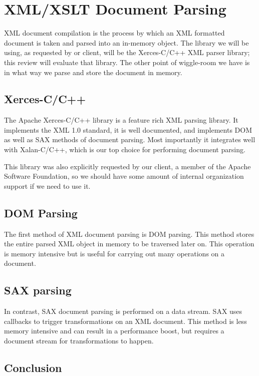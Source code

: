 \section{XML/XSLT Document Parsing}

XML document compilation is the process by which an XML formatted document is taken and parsed into an in-memory object.
The library we will be using, as requested by or client, will be the Xerces-C/C++ XML parser library; this review will evaluate that library.
The other point of wiggle-room we have is in what way we parse and store the document in memory.

\subsection{Xerces-C/C++}

The Apache Xerces-C/C++ library is a feature rich XML parsing library.
It implements the XML 1.0 standard, it is well documented, and implements DOM as well as SAX methods of document parsing.
Most importantly it integrates well with Xalan-C/C++, which is our top choice for performing document parsing.

This library was also explicitly requested by our client, a member of the Apache Software Foundation, so we should have some amount of internal organization support if we need to use it.

\subsection{DOM Parsing}

The first method of XML document parsing is DOM parsing.
This method stores the entire parsed XML object in memory to be traversed later on.
This operation is memory intensive but is useful for carrying out many operations on a document.
\cite{dom-vs-sax}

\subsection{SAX parsing}

In contrast, SAX document parsing is performed on a data stream.
SAX uses callbacks to trigger transformations on an XML document.
This method is less memory intensive and can result in a performance boost, but requires a document stream for transformations to happen.
\cite{dom-vs-sax}

\subsection{Conclusion}

